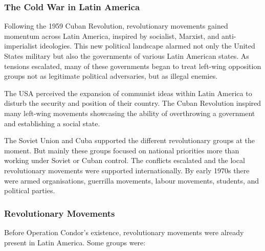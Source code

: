 \subsubsection{The Cold War in Latin America}

Following the 1959 Cuban Revolution, revolutionary movements gained momentum across Latin America, inspired by socialist, Marxist, and anti-imperialist ideologies. This new political landscape alarmed not only the United States military but also the governments of various Latin American states. As tensions escalated, many of these governments began to treat left-wing opposition groups not as legitimate political adversaries, but as illegal enemies.

The USA perceived the expansion of communist ideas within Latin America to disturb the security and position of their country. The Cuban Revolution inspired many left-wing movements showcasing the ability of overthrowing a government and establishing a social state.

The Soviet Union and Cuba supported the different revolutionary groups at the moment. But mainly these groups focused on national priorities more than working under Soviet or Cuban control. The conflicts escalated and the local revolutionary movements were supported internationally. By early 1970s there were armed organisations, guerrilla movements, labour movements, students, and political parties.

\subsubsection{Revolutionary Movements}

Before Operation Condor’s existence, revolutionary movements were already present in Latin America. Some groups were:

